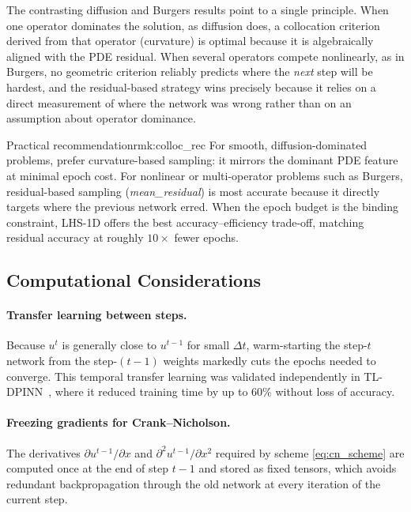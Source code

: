 The contrasting diffusion and Burgers results point to a single principle. When
one operator dominates the solution, as diffusion does, a collocation criterion
derived from that operator (curvature) is optimal because it is algebraically
aligned with the PDE residual. When several operators compete nonlinearly, as
in Burgers, no geometric criterion reliably predicts where the \emph{next} step
will be hardest, and the residual-based strategy wins precisely because it
relies on a direct measurement of where the network was wrong rather than on an
assumption about operator dominance.

\begin{Rmk}{Practical recommendation}{rmk:colloc_rec}
  For smooth, diffusion-dominated problems, prefer curvature-based sampling: it
  mirrors the dominant PDE feature at minimal epoch cost. For nonlinear or
  multi-operator problems such as Burgers, residual-based sampling
  (\textit{mean\_residual}) is most accurate because it directly targets where
  the previous network erred. When the epoch budget is the binding constraint,
  LHS-1D offers the best accuracy--efficiency trade-off, matching residual
  accuracy at roughly $10\times$ fewer epochs.
\end{Rmk}

\subsection{Computational Considerations}

\paragraph{Transfer learning between steps.}
Because $u^t$ is generally close to $u^{t-1}$ for small $\Delta t$, warm-starting
the step-$t$ network from the step-$(t{-}1)$ weights markedly cuts the epochs
needed to converge. This temporal transfer learning was validated independently
in TL-DPINN~\cite{Chen2023}, where it reduced training time by up to $60\%$
without loss of accuracy.

\paragraph{Freezing gradients for Crank--Nicholson.}
The derivatives $\partial u^{t-1}/\partial x$ and
$\partial^2 u^{t-1}/\partial x^2$ required by scheme \eqref{eq:cn_scheme} are
computed once at the end of step $t-1$ and stored as fixed tensors, which
avoids redundant backpropagation through the old network at every iteration of
the current step.

